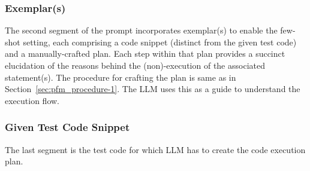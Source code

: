\subsubsection*{Exemplar(s)}
\label{subsec:examplar}
The second segment of the prompt incorporates exemplar(s) to enable the few-shot setting, each comprising a code snippet (distinct from the given test code) and a manually-crafted plan. Each step within that plan provides a succinct elucidation of the reasons behind the (non)-execution of the associated statement(s). The procedure for crafting the plan is same as in Section~\ref{sec:pfm_procedure-1}. The LLM uses this as a guide to understand the execution flow.


\subsubsection*{Given Test Code Snippet}
\label{subsec:testcode}
The last segment is the test code for which LLM has to create the code execution plan. 

